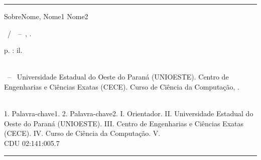 \begin{fichacatalografica}

	\vspace*{15cm}       %

	\hrule %

	\begin{center}       %

	\begin{minipage}[c]{12.5cm}  %
	
	SobreNome, Nome1 Nome2 %
 
	\hspace{0.5cm}  \imprimirtitulo~/~\imprimirautor~--~\imprimirlocal,  \imprimirdata.
	
	\hspace{0.5cm}  \pageref{LastPage}  p.  :  il.\\

	\hspace{0.5cm}  \imprimirorientadorRotulo ~\imprimirorientador\\

	\hspace{0.5cm}

\parbox[t]{\textwidth}{\imprimirtipotrabalho ~--~ Universidade Estadual do Oeste do Paraná (UNIOESTE). Centro de Engenharias e Ciências Exatas (CECE). Curso de Ciência da Computação, \imprimirdata.}\\

\hspace{0.5cm}
	1.  Palavra-chave1.
	2.  Palavra-chave2.
	I.  Orientador.
	II.  Universidade Estadual do Oeste do Paraná (UNIOESTE).
	III. Centro de Engenharias e Ciências Exatas (CECE).
	IV. Curso de Ciência da Computação.
	V.  \imprimirtitulo\\
	
	\hspace{8.75cm}  CDU  02:141:005.7\\

	\end{minipage}
	\end{center}
	\hrule
\end{fichacatalografica}
